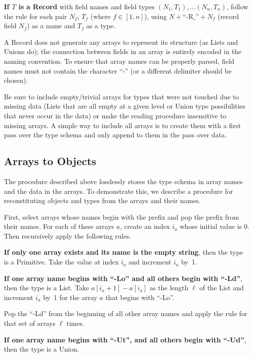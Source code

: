 \documentclass[10pt, conference, compsocconf]{IEEEtran}
\begin{document}
{\bf If $T$ is a Record} with field names and field types $(N_1, T_1), \ldots (N_n, T_n)$, follow the rule for each pair $N_f$, $T_f$ (where $f \in [1, n]$), using $N + \mbox{``-R\_''} + N_f$ (record field $N_f$) as a name and $T_f$ as a type.

A Record does not generate any arrays to represent its structure (as Lists and Unions do); the connection between fields in an array is entirely encoded in the naming convention. To ensure that array names can be properly parsed, field names must not contain the character ``-'' (or a different delimiter should be chosen).

Be sure to include empty/trivial arrays for types that were not touched due to missing data (Lists that are all empty at a given level or Union type possibilities that never occur in the data) or make the reading procedure insensitive to missing arrays. A simple way to include all arrays is to create them with a first pass over the type schema and only append to them in the pass over data.

\subsection{Arrays to Objects}

The procedure described above losslessly stores the type schema in array names and the data in the arrays. To demonstrate this, we describe a procedure for reconstituting objects and types from the arrays and their names.

First, select arrays whose names begin with the prefix and pop the prefix from their names. For each of these arrays $a$, create an index $i_a$ whose initial value is 0. Then recursively apply the following rules.

{\bf If only one array exists and its name is the empty string}, then the type is a Primitive. Take the value at index $i_a$ and increment $i_a$ by~1.

{\bf If one array name begins with ``-Lo'' and all others begin with ``-Ld''}, then the type is a List. Take $a[i_a + 1] - a[i_a]$ as the length $\ell$ of the List and increment $i_a$ by~1 for the array $a$ that begins with ``-Lo''.

Pop the ``-Ld'' from the beginning of all other array names and apply the rule for that set of arrays $\ell$ times.

{\bf If one array name begins with ``-Ut'', and all others begin with ``-Ud''}, then the type is a Union.
\end{document}
